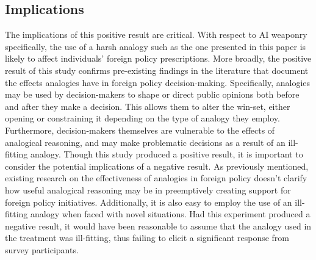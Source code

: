 \documentclass[12pt]{article}
\begin{document}
\subsection {Implications}
The implications of this positive result are critical. With respect to AI weaponry specifically, the use of a harsh analogy such as the one presented in this paper is likely to affect individuals’ foreign policy prescriptions. More broadly, the positive result of this study confirms pre-existing findings in the literature that document the effects analogies have in foreign policy decision-making. Specifically, analogies may be used by decision-makers to shape or direct public opinions both before and after they make a decision. This allows them to alter the win-set, either opening or constraining it depending on the type of analogy they employ. Furthermore, decision-makers themselves are vulnerable to the effects of analogical reasoning, and may make problematic decisions as a result of an ill-fitting analogy. 
\bigbreak
Though this study produced a positive result, it is important to consider the potential implications of a negative result. As previously mentioned, existing research on the effectiveness of analogies in foreign policy doesn’t clarify how useful analogical reasoning may be in preemptively creating support for foreign policy initiatives. Additionally, it is also easy to employ the use of an ill-fitting analogy when faced with novel situations. Had this experiment produced a negative result, it would have been reasonable to assume that the analogy used in the treatment was ill-fitting, thus failing to elicit a significant response from survey participants.
\newpage
\end{document}
